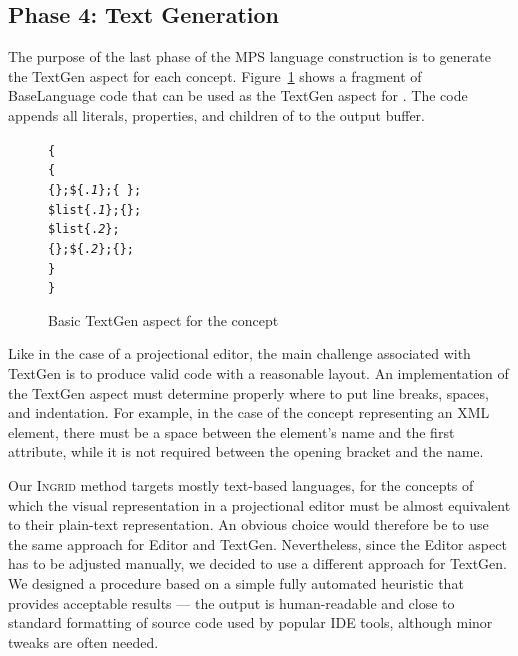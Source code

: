 \subsection{Phase 4: Text Generation}
\label{sect:TEXTGENDEF}

The purpose of the last phase of the MPS language construction is to generate the TextGen aspect for each concept.
Figure~\ref{fig:TEXTGENBASIC} shows a fragment of BaseLanguage code that can be used as the TextGen aspect for .
The code appends all literals, properties, and children of  to the output buffer.

\begin{figure}[ht]
\begin{alltt}
\small
{}  \{
   \{
     \{\mpstgliteral{<}\};  \$\{.\textit{1}\};  \{\ \};
     \$list\{.\textit{1}\};  \{\mpstgliteral{>}\};
     \$list\{.\textit{2}\};
     \{\mpstgliteral{</}\};  \$\{.\textit{2}\};  \{\mpstgliteral{>}\};
  \}
\}
\end{alltt}
\caption{Basic TextGen aspect for the  concept}
\label{fig:TEXTGENBASIC}
\vspace{-3mm}
\end{figure}

Like in the case of a projectional editor, the main challenge associated with TextGen is to produce valid code with a reasonable layout.
An implementation of the TextGen aspect must determine properly where to put line breaks, spaces, and indentation.
For example, in the case of the concept representing an XML element, there must be a space between the element's name and the first attribute, while it is not required between the opening bracket \antlrliteral{\textless} and the name.

Our \textsc{Ingrid} method targets mostly text-based languages, for the concepts of which the visual representation in a projectional editor must be almost equivalent to their plain-text representation.
An obvious choice would therefore be to use the same approach for Editor and TextGen.
Nevertheless, since the Editor aspect has to be adjusted manually, we decided to use a different approach for TextGen.
We designed a procedure based on a simple fully automated heuristic that provides acceptable results --- the output is human-readable and close to standard formatting of source code used by popular IDE tools, although minor tweaks are often needed.

